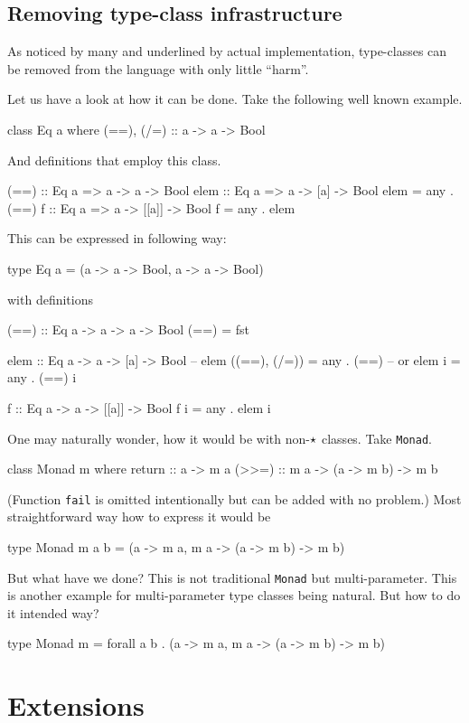 \documentclass[11pt,oneside,draft]{fithesis2}
\begin{document}
\section{Removing type-class infrastructure}

As noticed by many and underlined by actual implementation, type-classes can be removed
from the language with only little ``harm''.

Let us have a look at how it can be done. Take the following well known example.
\begin{code}
class Eq a where
    (==), (/=) :: a -> a -> Bool
\end{code}
And definitions that employ this class.
\begin{code}
(==) :: Eq a => a -> a -> Bool
elem :: Eq a => a -> [a] -> Bool
elem = any . (==)
f :: Eq a => a -> [[a]] -> Bool
f = any . elem
\end{code}
This can be expressed in following way:
\begin{code}
type Eq a = (a -> a -> Bool, a -> a -> Bool)
\end{code}
with definitions
\begin{code}
(==) :: Eq a -> a -> a -> Bool
(==) = fst

elem :: Eq a -> a -> [a] -> Bool
-- elem ((==), (/=)) = any . (==)
-- or
elem i = any . (==) i

f :: Eq a -> a -> [[a]] -> Bool
f i = any . elem i
\end{code}

One may naturally wonder, how it would be with non-\(\star\) classes.
Take \texttt{Monad}.
\begin{code}
class Monad m where
	return :: a -> m a
	(>>=) :: m a -> (a -> m b) -> m b
\end{code}
(Function \texttt{fail} is omitted intentionally but can be added with
no problem.)
Most straightforward way how to express it would be
\begin{code}
type Monad m a b = (a -> m a, m a -> (a -> m b) -> m b)
\end{code}
But what have we done? This is not traditional \texttt{Monad} but
multi-parameter. This is another example for multi-parameter type classes
being natural. But how to do it intended way?
\begin{code}
type Monad m = forall a b . (a -> m a, m a -> (a -> m b) -> m b)
\end{code}


\chapter{Extensions}
\end{document}
